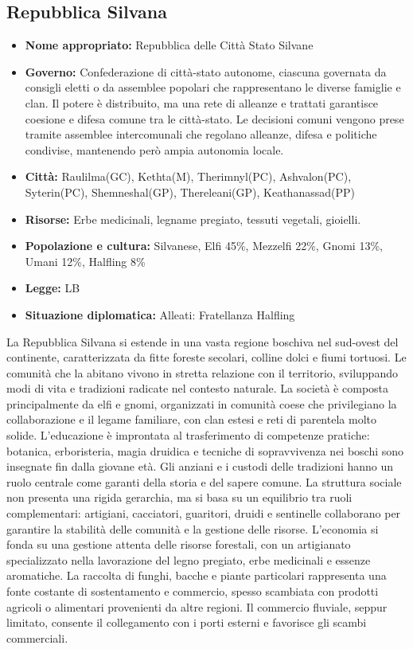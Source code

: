 \documentclass[10pt, a4paper]{report}
\begin{document}
\begin{multicols}{2}
\subsection*{Repubblica Silvana}
\begin{itemize}
	\item \textbf{Nome appropriato:} Repubblica delle Città Stato Silvane 
	\item \textbf{Governo:} Confederazione di città-stato autonome, ciascuna governata da consigli eletti o da assemblee popolari che rappresentano le diverse famiglie e clan. Il potere è distribuito, ma una rete di alleanze e trattati garantisce coesione e difesa comune tra le città-stato. Le decisioni comuni vengono prese tramite assemblee intercomunali che regolano alleanze, difesa e politiche condivise, mantenendo però ampia autonomia locale.
	\item \textbf{Città:} Raulilma(GC), Kethta(M), Therimnyl(PC), Ashvalon(PC), Syterin(PC), Shemneshal(GP), Thereleani(GP), Keathanassad(PP)
	\item \textbf{Risorse:} Erbe medicinali, legname pregiato, tessuti vegetali, gioielli. 
	\item \textbf{Popolazione e cultura:} Silvanese, Elfi 45\%, Mezzelfi 22\%, Gnomi 13\%, Umani 12\%, Halfling 8\%
	\item \textbf{Legge:} LB
	\item \textbf{Situazione diplomatica:} Alleati: Fratellanza Halfling
\end{itemize}
La Repubblica Silvana si estende in una vasta regione boschiva nel sud-ovest del continente, caratterizzata da fitte foreste secolari, colline dolci e fiumi tortuosi. Le comunità che la abitano vivono in stretta relazione con il territorio, sviluppando modi di vita e tradizioni radicate nel contesto naturale.
La società è composta principalmente da elfi e gnomi, organizzati in comunità coese che privilegiano la collaborazione e il legame familiare, con clan estesi e reti di parentela molto solide. L’educazione è improntata al trasferimento di competenze pratiche: botanica, erboristeria, magia druidica e tecniche di sopravvivenza nei boschi sono insegnate fin dalla giovane età. Gli anziani e i custodi delle tradizioni hanno un ruolo centrale come garanti della storia e del sapere comune.
La struttura sociale non presenta una rigida gerarchia, ma si basa su un equilibrio tra ruoli complementari: artigiani, cacciatori, guaritori, druidi e sentinelle collaborano per garantire la stabilità delle comunità e la gestione delle risorse.
L’economia si fonda su una gestione attenta delle risorse forestali, con un artigianato specializzato nella lavorazione del legno pregiato, erbe medicinali e essenze aromatiche. La raccolta di funghi, bacche e piante particolari rappresenta una fonte costante di sostentamento e commercio, spesso scambiata con prodotti agricoli o alimentari provenienti da altre regioni. Il commercio fluviale, seppur limitato, consente il collegamento con i porti esterni e favorisce gli scambi commerciali.

\end{multicols}
\end{document}
